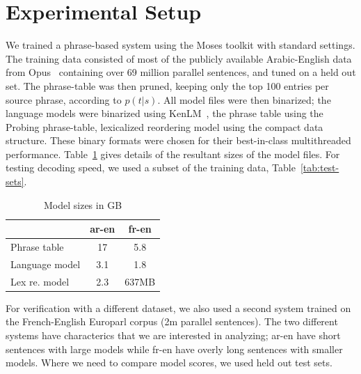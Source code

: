 \documentclass[11pt]{article}
\begin{document}
\section{Experimental Setup}

We trained a phrase-based system using the Moses toolkit with standard settings. The training data consisted of most of the publicly available Arabic-English data from Opus~\cite{tiedemann2012parallel} containing over 69 million parallel sentences, and tuned on a held out set. The phrase-table was then pruned, keeping only the top 100 entries per source phrase, according to $p(t|s)$. All model files were then binarized; the language models were binarized using KenLM~\cite{Heafield-kenlm}, the phrase table using the Probing phrase-table, lexicalized reordering model using the compact data structure. These binary formats were chosen for their best-in-class multithreaded performance. Table~\ref{tab:model-files} gives details of the resultant sizes of the model files. For testing decoding speed, we used a subset of the training data, Table~\ref{tab:test-sets}. 
\begin{table}[h]
\begin{center}
\begin{tabular}{|l|c|c|} \hline
		& ar-en	& fr-en \\ \hline
Phrase table  	& 17 	& 5.8 \\
Language model 	& 3.1  	& 1.8 \\ 
Lex re. model	& 2.3	& 637MB \\ \hline
\end{tabular}
\end{center}
\caption{Model sizes in GB}
\label{tab:model-files}
\end{table}

For verification with a different dataset, we also used a second system trained on the French-English Europarl corpus (2m parallel sentences). The two different systems have characterics that we are interested in analyzing; ar-en have short sentences with large models while fr-en have overly long sentences with smaller models. Where we need to compare model scores, we used held out test sets.
\end{document}

